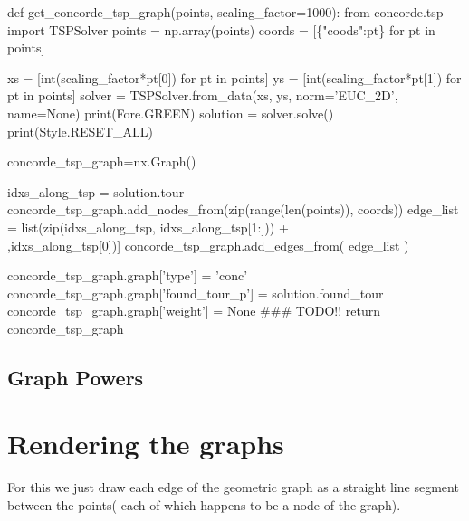 \nwenddocs{}\plusendmoddef\nwstartdeflinemarkup{}\nwenddeflinemarkup
def get_concorde_tsp_graph(points, scaling_factor=1000):
     from concorde.tsp import TSPSolver
     points = np.array(points)
     coords = [\{"coods":pt\} for pt in points]

     xs = [int(scaling_factor*pt[0]) for pt in points]
     ys = [int(scaling_factor*pt[1]) for pt in points]
     solver = TSPSolver.from_data(xs, ys, norm='EUC_2D', name=None)
     print(Fore.GREEN)
     solution = solver.solve()
     print(Style.RESET_ALL)

     concorde_tsp_graph=nx.Graph()
          
     idxs_along_tsp = solution.tour
     concorde_tsp_graph.add_nodes_from(zip(range(len(points)), coords))
     edge_list = list(zip(idxs_along_tsp, idxs_along_tsp[1:])) + \\
                    [(idxs_along_tsp[-1],idxs_along_tsp[0])]
     concorde_tsp_graph.add_edges_from(  edge_list  )

     concorde_tsp_graph.graph['type']   = 'conc'
     concorde_tsp_graph.graph['found_tour_p'] = solution.found_tour
     concorde_tsp_graph.graph['weight'] = None ### TODO!! 
     return concorde_tsp_graph
\nwendcode{}\nwdocspar



\subsection{Graph Powers}



\section{Rendering the graphs}

For this we just draw each edge of the geometric graph as a straight line segment 
between the points( each of which happens to be a node of the graph). 


